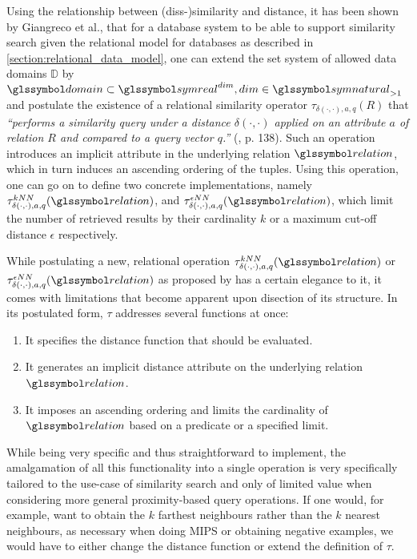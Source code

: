 Using the relationship between (diss-)similarity and distance, it has been shown by Giangreco et al., that for a database system to be able to support similarity search given the relational model for databases as described in \cref{section:relational_data_model}, one can extend the set system of allowed data domains $\mathbb{D}$ by $\domain \subset \symreal^{dim}, dim \in \symnatural_{>1}$ and postulate the existence of a relational similarity operator $\tau_{\delta(\cdot,\cdot),a,q}(R)$ that \emph{``performs a similarity query under a distance $\delta(\cdot,\cdot)$ applied on an attribute $a$ of relation $R$ and compared to a query vector $q$.''} (\cite{Giangreco:2018thesis}, p. 138). Such an operation introduces an implicit attribute in the underlying relation $\relation$, which in turn induces an ascending ordering of the tuples. Using this operation, one can go on to define two concrete implementations, namely $\tau^{kNN}_{\delta(\cdot,\cdot),a,q}(\relation)$, and $\tau^{\epsilon NN}_{\delta(\cdot,\cdot),a,q}(\relation)$, which limit the number of retrieved results by their cardinality $k$ or a maximum cut-off distance $\epsilon$ respectively.

While postulating a new, relational operation $\tau^{kNN}_{\delta(\cdot,\cdot),a,q}(\relation)$ or $\tau^{\epsilon NN}_{\delta(\cdot,\cdot),a,q}(\relation)$ as proposed by \cite{Giangreco:2018thesis} has a certain elegance to it, it comes with limitations that become apparent upon disection of its structure. In its postulated form, $\tau$ addresses several functions at once:

\begin{enumerate}
    \item It specifies the distance function that should be evaluated.
    \item It generates an implicit distance attribute on the underlying relation $\relation$.
    \item It imposes an ascending ordering and limits the cardinality of $\relation$ based on a predicate or a specified limit.
\end{enumerate}

While being very specific and thus straightforward to implement, the amalgamation of all this functionality into a single operation is very specifically tailored to the use-case of similarity search and only of limited value when considering more general proximity-based query operations. If one would, for example, want to obtain the $k$ farthest neighbours rather than the $k$ nearest neighbours, as necessary when doing MIPS or obtaining negative examples, we would have to either change the distance function or extend the definition of $\tau$. 


